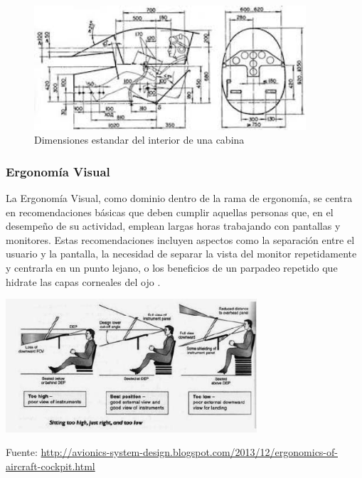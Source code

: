 \begin{figure}[!htb]
  \centering
  \includegraphics[width=0.9\textwidth]{01.tablero.instrumentos/U01.imagenes/1.1.introduccion/ergonomia_fisica.jpeg}
  
  \caption{Dimensiones estandar del interior de una cabina \protect\cite{cabina_ergonomia_fisica}}
\label{fig:01.dimensiones.estandard.cabina}
\end{figure}




\subsubsection{Ergonom\'ia Visual}
\label{sec:01.ergonomia.visual}


La Ergonom\'ia Visual, como dominio dentro de la rama de ergonom\'ia, se centra en recomendaciones b\'asicas que deben cumplir aquellas personas que, en el desempe\~no de su actividad, emplean largas horas trabajando con pantallas y monitores. Estas recomendaciones incluyen aspectos como la separaci\'on entre el usuario y la pantalla, la necesidad de separar la vista del monitor repetidamente y centrarla en un punto lejano, o los beneficios de un parpadeo repetido que hidrate las capas corneales del ojo \cite{wiki_ergonomia_fisica}. 

\begin{center}
  \includegraphics[width=0.7\textwidth]{01.tablero.instrumentos/U01.imagenes/1.1.introduccion/ergonomia_visual.jpg}
\end{center}
{\tiny Fuente: \url{http://avionics-system-design.blogspot.com/2013/12/ergonomics-of-aircraft-cockpit.html}}



